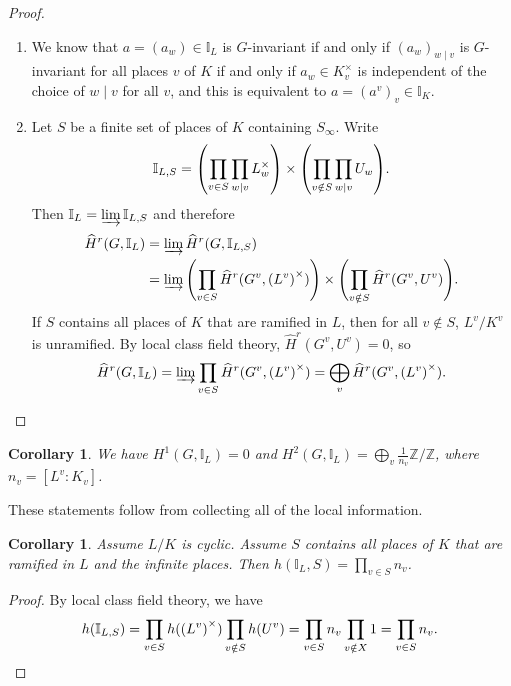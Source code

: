 \documentclass[leqno, openany]{memoir}
\newtheorem{cor}[thm]{Corollary}
\theoremstyle{definition}
\theoremstyle{remark}
\theoremstyle{plain}
\theoremstyle{definition}
\theoremstyle{remark}
\newcommand{\Z}{\mathbb{Z}}
\newcommand{\I}{\mathbb{I}}
\newcommand{\wh}[1]{\widehat{#1}}
\begin{document}
\begin{proof}\leavevmode
    \begin{enumerate}
        \item We know that $a = {(a_w)} \in \I_L$ is $G$-invariant if and only if ${(a_w)}_{w \mid v}$ is $G$-invariant for all places $v$ of $K$ if and only if $a_w \in K_v^{\times}$ is independent of the choice of $w \mid v$ for all $v$, and this is equivalent to $a = {(a^v)}_v \in \I_K$.
        \item Let $S$ be a finite set of places of $K$ containing $S_{\infty}$. Write
            \[ \I_{L, S} = \qty(\prod_{v \in S} \prod_{w \mid v} L_w^{\times}) \times \qty(\prod_{v \notin S} \prod_{w \mid v} U_w). \]
            Then $\I_L = \varinjlim \I_{L, S}$ and therefore 
            \begin{align*}
                \wh{H}^r(G, \I_L) &= \varinjlim \wh{H}^r(G, \I_{L, S}) \\
                                  &= \varinjlim \qty(\prod_{v \in S} \wh{H}^r(G^v, {(L^v)}^{\times})) \times \qty(\prod_{v \notin S} \wh{H}^r(G^v, U^v)).
            \end{align*}
            If $S$ contains all places of $K$ that are ramified in $L$, then for all $v \notin S$, $L^v/K^v$ is unramified. By local class field theory, $\wh{H}^r(G^v, U^v) = 0$, so 
            \[ \wh{H}^r(G, \I_L) = \varinjlim \prod_{v \in S} \wh{H}^r(G^v, {(L^v)}^{\times}) = \bigoplus_v \wh{H}^r(G^v, {(L^v)}^{\times}). \qedhere \]
    \end{enumerate}
\end{proof}

\begin{cor}
    We have $H^1(G, \I_L) = 0$ and $H^2(G, \I_L) = \bigoplus_v \frac{1}{n_v} \Z/\Z$, where $n_v = [L^v: K_v]$.
\end{cor}

These statements follow from collecting all of the local information.

\begin{cor}
    Assume $L/K$ is cyclic. Assume $S$ contains all places of $K$ that are ramified in $L$ and the infinite places. Then $h(\I_L, S) = \prod_{v \in S} n_v$.
\end{cor}

\begin{proof}
    By local class field theory, we have
    \[ h(\I_{L, S}) = \prod_{v \in S} h({(L^v)}^{\times}) \prod_{v \notin S} h(U^v) = \prod_{v \in S} n_v \prod_{v \notin X} 1 = \prod_{v \in S} n_v. \qedhere \]
\end{proof}
\end{document}
